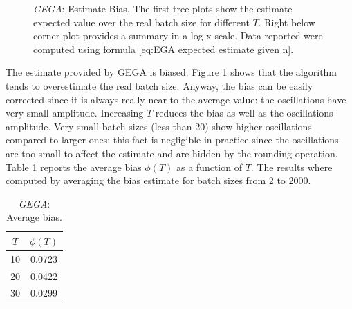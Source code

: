 \documentclass[11pt,a4paper,twoside,openright]{book}
\begin{document}
\begin{figure}[thbp]
\caption[\emph{GEGA}: Estimate Bias]{\emph{GEGA}: Estimate Bias. The first tree plots show the estimate expected value over the real batch size for different $T$. Right below corner plot provides a summary in a log x-scale. Data reported were computed using formula \eqref{eq:EGA expected estimate given n}.}
\label{fg:GEGA-bias}
\end{figure}

The estimate provided by GEGA is biased. Figure \ref{fg:GEGA-bias} shows that the algorithm tends to overestimate the real batch size. Anyway, the bias can be easily corrected since it is always really near to the average value: the oscillations have very small amplitude. Increasing $T$ reduces the bias as well as the oscillations amplitude. Very small batch sizes (less than 20) show higher oscillations compared to larger ones: this fact is negligible in practice since the oscillations are too small to affect the estimate and are hidden by the rounding operation. Table \ref{tb:GEGA-average-bias} reports the average bias $\phi(T)$ as a function of $T$. The results where computed by averaging the bias estimate for batch sizes from 2 to 2000.\\ 

\begin{table}[htdp]
\centering
\begin{tabular}{c|c}
\toprule
$T$ & $\phi(T)$ \\
\midrule
10 & 0.0723  \\
20 & 0.0422  \\
30 & 0.0299\\
\bottomrule
\end{tabular} 
\caption{\emph{GEGA}: Average bias.}
\label{tb:GEGA-average-bias}
\end{table}
\end{document}

